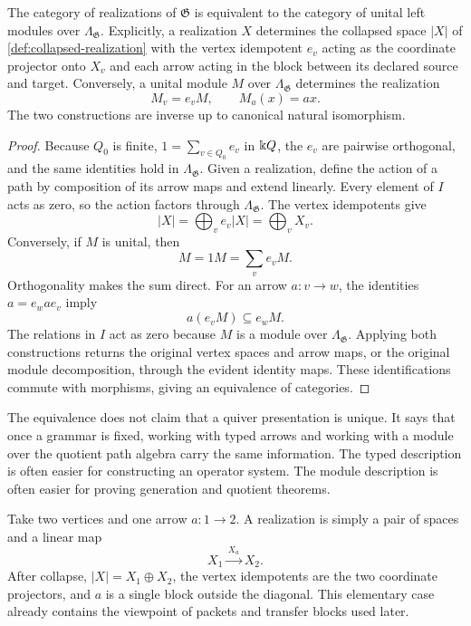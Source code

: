 \begin{theorem}
\label{thm:typed-module-equivalence}
The category of realizations of $\mathfrak G$ is equivalent to the category of unital left modules over $\Lambda_{\mathfrak G}$.  Explicitly, a realization $X$ determines the collapsed space $|X|$ of \cref{def:collapsed-realization}
with the vertex idempotent $e_v$ acting as the coordinate projector onto $X_v$ and each arrow acting in the block between its declared source and target.  Conversely, a unital module $M$ over $\Lambda_{\mathfrak G}$ determines the realization
\[
M_v=e_vM,
\qquad
M_a(x)=ax.
\]
The two constructions are inverse up to canonical natural isomorphism.
\end{theorem}

\begin{proof}
Because $Q_0$ is finite, $1=\sum_{v\in Q_0}e_v$ in $\Bbbk Q$, the $e_v$ are pairwise orthogonal, and the same identities hold in $\Lambda_{\mathfrak G}$.  Given a realization, define the action of a path by composition of its arrow maps and extend linearly.  Every element of $I$ acts as zero, so the action factors through $\Lambda_{\mathfrak G}$.  The vertex idempotents give
\[
|X|=\bigoplus_v e_v|X|=\bigoplus_vX_v.
\]
Conversely, if $M$ is unital, then
\[
M=1M=\sum_ve_vM.
\]
Orthogonality makes the sum direct.  For an arrow $a:v\to w$, the identities $a=e_wae_v$ imply
\[
a(e_vM)\subseteq e_wM.
\]
The relations in $I$ act as zero because $M$ is a module over $\Lambda_{\mathfrak G}$.  Applying both constructions returns the original vertex spaces and arrow maps, or the original module decomposition, through the evident identity maps.  These identifications commute with morphisms, giving an equivalence of categories.
\end{proof}

\begin{interpretation}
The equivalence does not claim that a quiver presentation is unique.  It says that once a grammar is fixed, working with typed arrows and working with a module over the quotient path algebra carry the same information.  The typed description is often easier for constructing an operator system.  The module description is often easier for proving generation and quotient theorems.
\end{interpretation}

\begin{microexample}[title={A grammar with two vertices}]
Take two vertices and one arrow \(a:1\to2\).  A realization is simply a pair of spaces and a linear map
\[
X_1\xrightarrow{\,X_a\,}X_2.
\]
After collapse, \(|X|=X_1\oplus X_2\), the vertex idempotents are the two coordinate projectors, and \(a\) is a single block outside the diagonal.  This elementary case already contains the viewpoint of packets and transfer blocks used later.
\end{microexample}


